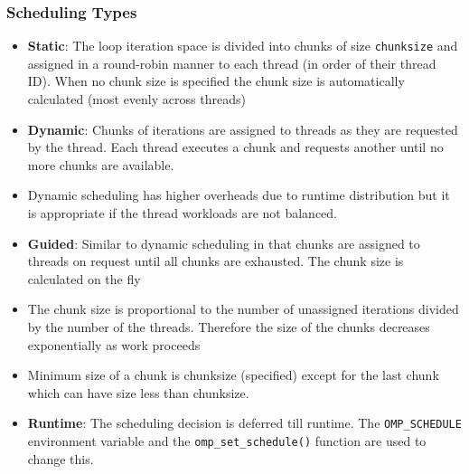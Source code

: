 \documentclass{article}
\begin{document}
\subsubsection{Scheduling Types}
\begin{itemize}
    \item \textbf{Static}: The loop iteration space is divided into chunks of size \texttt{chunksize} and assigned in a round-robin manner to each thread (in order of their thread ID). When no chunk size is specified the chunk size is automatically calculated (most evenly across threads)
    
    \item \textbf{Dynamic}: Chunks of iterations are assigned to threads as they are requested by the thread. Each thread executes a chunk and requests another until no more chunks are available. 
    
    \item Dynamic scheduling has higher overheads due to runtime distribution but it is appropriate if the thread workloads are not balanced.
    
    \item \textbf{Guided}: Similar to dynamic scheduling in that chunks are assigned to threads on request until all chunks are exhausted. The chunk size is calculated on the fly 
    
    \item The chunk size is proportional to the number of unassigned iterations divided by the number of the threads. Therefore the size of the chunks decreases exponentially as work proceeds
    
    \item Minimum size of a chunk is chunksize (specified) except for the last chunk which can have size less than chunksize.
    
    \item \textbf{Runtime}: The scheduling decision is deferred till runtime. The \texttt{OMP\_SCHEDULE} environment variable and the \texttt{omp\_set\_schedule()} function are used to change this. 
\end{itemize}
\end{document}
